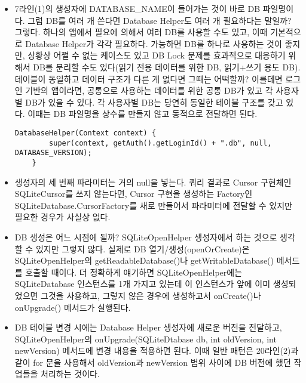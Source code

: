\begin{itemize}
\item 7라인(1)의 생성자에 DATABASE\_NAME이 들어가는 것이 바로 DB 파일명이다.
그럼 DB를 여러 개 쓴다면 Database Helper도 여러 개 필요하다는 말일까? 그렇다. 
하나의 앱에서 필요에 의해서 여러 DB를 사용할 수도 있고, 이때 기본적으로 Database Helper가 각각 필요하다.
가능하면 DB를 하나로 사용하는 것이 좋지만, 상황상 어쩔 수 없는 케이스도 있고 DB Lock 문제를 효과적으로 대응하기 위해서 DB를 분리할 수도 있다(읽기 전용 데이터를 위한 DB, 읽기+쓰기 용도 DB).\\

테이블이 동일하고 데이터 구조가 다른 게 없다면 그때는 어떡할까? 
이를테면 로그인 기반의 앱이라면, 공통으로 사용하는 데이터를 위한 공통 DB가 있고 각 사용자별 DB가 있을 수 있다. 
각 사용자별 DB는 당연히 동일한 테이블 구조를 갖고 있다. 이때는 DB 파일명을 상수를 만들지 않고 동적으로 전달하면 된다.
\begin{lstlisting}[frame=single] 
    DatabaseHelper(Context context) {
        super(context, getAuth().getLoginId() + ".db", null, DATABASE_VERSION);
    }
\end{lstlisting}

\item 생성자의 세 번째 파라미터는 거의 null을 넣는다. 
쿼리 결과로 Cursor 구현체인 SQLiteCursor를 쓰지 않는다면, Cursor 구현을 생성하는 Factory인 
SQLiteDatabase.CursorFactory를 새로 만들어서 파라미터에 전달할 수 있지만 필요한 경우가 사실상 없다.

\item DB 생성은 어느 시점에 될까? SQLiteOpenHelper 생성자에서 하는 것으로 생각할 수 있지만 그렇지 않다.
실제로 DB 열기/생성(openOrCreate)은 SQLiteOpenHelper의 getReadableDatabase()나 getWritableDatabase() 메서드를 호출할 때이다.
더 정확하게 얘기하면 SQLiteOpenHelper에는 SQLiteDatabase 인스턴스를 1개 가지고 있는데 이 인스턴스가 앞에 이미 생성되었으면 그것을 사용하고, 그렇지 않은 경우에 생성하고서 onCreate()나 onUpgrade() 메서드가 실행된다.

\item DB 테이블 변경 시에는 Database Helper 생성자에 새로운 버전을 전달하고, 
SQLiteOpenHelper의 onUpgrade(SQLiteDtabase db, int oldVersion, int newVersion) 메서드에 변경 내용을 적용하면 된다. 
이때 일반 패턴은 20라인(2)과 같이 for 문을 사용해서 oldVersion과 newVersion 범위 사이에 DB 버전에 했던 작업들을 처리하는 것이다.


\end{itemize}
